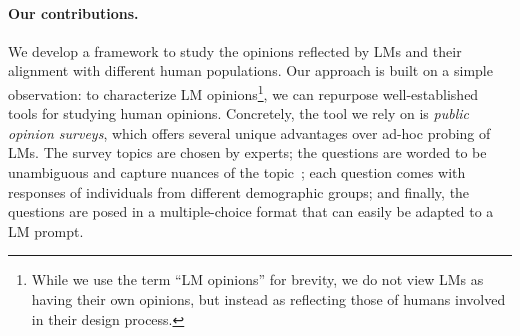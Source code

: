 \paragraph{Our contributions.} 
We develop a framework to study the opinions reflected by LMs and their alignment with different human populations.
Our approach is built on a simple observation: to characterize LM opinions\footnote{While we use the term ``LM opinions'' for brevity, we do not view LMs as having their own opinions, but instead as reflecting those of humans involved in their design process.}, we can repurpose well-established tools for studying human opinions.
Concretely, the tool we rely on is \emph{public opinion surveys}, which offers several unique advantages over ad-hoc probing of LMs. 
The survey topics are chosen by experts; the questions are worded to be unambiguous and capture nuances of the topic~\citep{pewwritingquestions}; each question comes with responses of individuals from different demographic groups; and finally, the questions are posed in a multiple-choice format that can easily be adapted to a LM prompt. 


